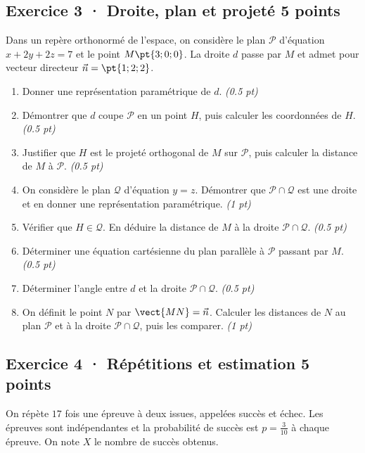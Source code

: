 \subsection*{Exercice 3 · Droite, plan et projeté \hfill 5 points}Dans un repère orthonormé de l'espace, on considère le plan $\mathcal P$ d'équation $x+2y+2z=7$ et le point $M\pt{3;0;0}$. La droite $d$ passe par $M$ et admet pour vecteur directeur $\vec n=\pt{1;2;2}$.

\begin{enumerate}

\item Donner une représentation paramétrique de $d$. \hfill\textit{(\num{0,5} pt)}

\item Démontrer que $d$ coupe $\mathcal P$ en un point $H$, puis calculer les coordonnées de $H$. \hfill\textit{(\num{0,5} pt)}

\item Justifier que $H$ est le projeté orthogonal de $M$ sur $\mathcal P$, puis calculer la distance de $M$ à $\mathcal P$. \hfill\textit{(\num{0,5} pt)}

\item On considère le plan $\mathcal Q$ d'équation $y=z$. Démontrer que $\mathcal P\cap\mathcal Q$ est une droite et en donner une représentation paramétrique. \hfill\textit{(1 pt)}

\item Vérifier que $H\in\mathcal Q$. En déduire la distance de $M$ à la droite $\mathcal P\cap\mathcal Q$. \hfill\textit{(\num{0,5} pt)}

\item Déterminer une équation cartésienne du plan parallèle à $\mathcal P$ passant par $M$. \hfill\textit{(\num{0,5} pt)}

\item Déterminer l'angle entre $d$ et la droite $\mathcal P\cap\mathcal Q$. \hfill\textit{(\num{0,5} pt)}

\item On définit le point $N$ par $\vect{MN}=\vec n$. Calculer les distances de $N$ au plan $\mathcal P$ et à la droite $\mathcal P\cap\mathcal Q$, puis les comparer. \hfill\textit{(1 pt)}

\end{enumerate}

\subsection*{Exercice 4 · Répétitions et estimation \hfill 5 points}On répète $17$ fois une épreuve à deux issues, appelées succès et échec. Les épreuves sont indépendantes et la probabilité de succès est $p=\frac{3}{10}$ à chaque épreuve. On note $X$ le nombre de succès obtenus.

